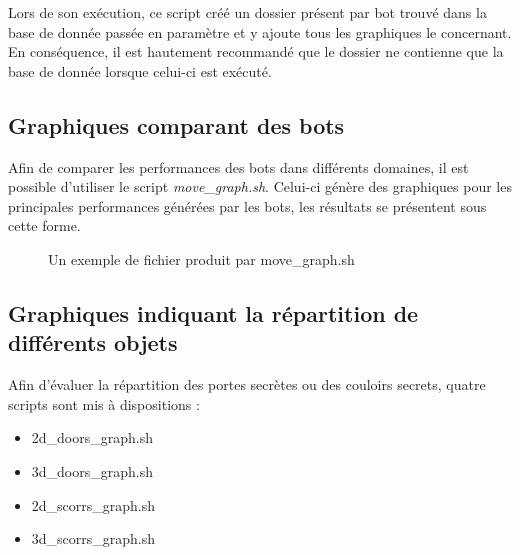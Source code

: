 \documentclass[10pt,a4paper]{report}
\begin{document}
Lors de son exécution, ce script créé un dossier présent par bot trouvé dans
la base de donnée passée en paramètre et y ajoute tous les graphiques le
concernant. En conséquence, il est hautement recommandé que le dossier ne
contienne que la base de donnée lorsque celui-ci est exécuté.

\subsection{Graphiques comparant des bots}
Afin de comparer les performances des bots dans différents domaines, il est
possible d'utiliser le script \emph{move\_graph.sh}. Celui-ci génère des
graphiques pour les principales performances générées par les bots, les
résultats se présentent sous cette forme.

\begin{figure}[H]
  \caption{\label{fig:move_graph} Un exemple de fichier produit par move\_graph.sh}
\end{figure}

\subsection{Graphiques indiquant la répartition de différents objets}
Afin d'évaluer la répartition des portes secrètes ou des couloirs secrets,
quatre scripts sont mis à dispositions :

\begin{itemize}
\item 2d\_doors\_graph.sh
\item 3d\_doors\_graph.sh
\item 2d\_scorrs\_graph.sh
\item 3d\_scorrs\_graph.sh
\end{itemize}
\end{document}
